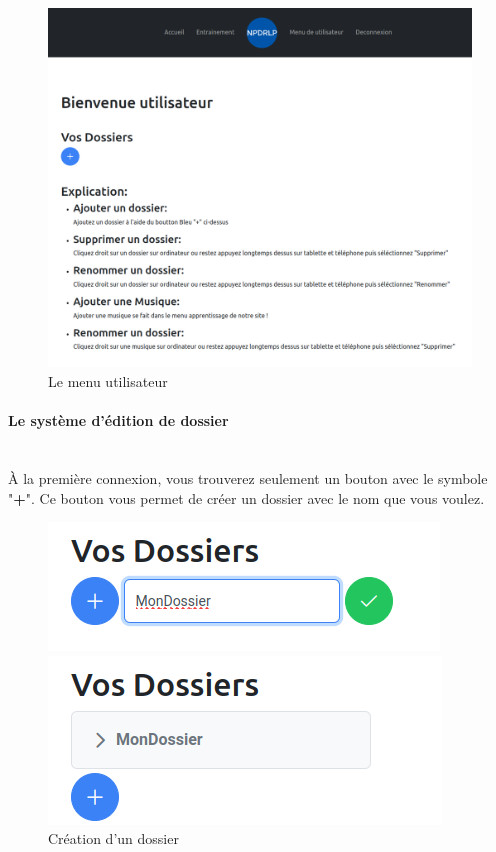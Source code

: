 \documentclass[12pt,french]{article}
\begin{document}
\begin{figure}[H]
	\centering
	\includegraphics[scale=0.25]{menu.png}
	\caption{Le menu utilisateur}
\end{figure}

\paragraph{Le système d'édition de dossier \\\\}

À la première connexion, vous trouverez seulement un bouton avec le symbole "\textbf{+}". Ce bouton vous permet de créer un dossier avec le nom que vous voulez.

\begin{figure}[H]
	\centering
	\begin{minipage}{.5\textwidth}
		\centering
		\includegraphics[scale=0.4]{dossier1.png}
	\end{minipage}%
	\begin{minipage}{.5\textwidth}
		\centering
		\includegraphics[scale=0.4]{dossier2.png}
	\end{minipage}
	\caption{Création d'un dossier}
\end{figure}
\end{document}
